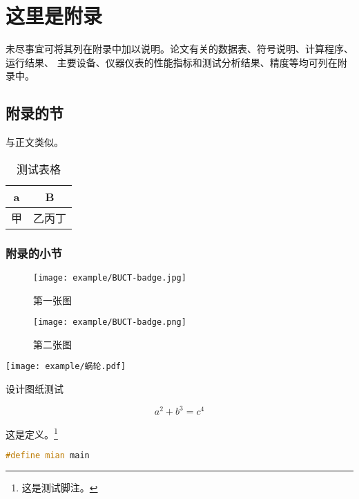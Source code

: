 \chapter{这里是附录}\label{app:1}
未尽事宜可将其列在附录中加以说明。论文有关的数据表、符号说明、计算程序、运行结果、
主要设备、仪器仪表的性能指标和测试分析结果、精度等均可列在附录中。
\section{附录的节}
与正文类似。
\begin{table}[ht]
	\centering
	\caption{测试表格}\label{tab:mytable}
	\begin{tabular}{cc}
		\toprule
		a & B   \\
		\midrule
		甲   & 乙丙丁 \\
		\bottomrule
	\end{tabular}
\end{table}

\subsection{附录的小节}
\zhlipsum[1][name = zhufu]

\begin{figure}[ht]
	\centering
	\begin{minipage}{0.3\textwidth}
		\centering
		\texttt{[image: example/BUCT-badge.jpg]}
		\caption{第一张图}\label{fig:test1}
	\end{minipage}
	\hspace{2cm}
	\begin{minipage}{0.3\textwidth}
		\centering
		\texttt{[image: example/BUCT-badge.png]}
		\caption{第二张图}\label{fig:test2}
	\end{minipage}
\end{figure}

\zhlipsum[name = xiangyu]

\begin{dfigure}[tbp]
	\centering\texttt{[image: example/蜗轮.pdf]}
	\caption{设计图纸测试}
\end{dfigure}

\zhlipsum[1][name = aspirin]

\begin{equation}
	a^2+b^3=c^4
\end{equation}

\begin{definition}
	这是定义。\footnote{这是测试脚注。}
\end{definition}

\begin{lstlisting}[language=c++,caption=一个测试,label=mycode]
#define mian main
	\end{lstlisting}

